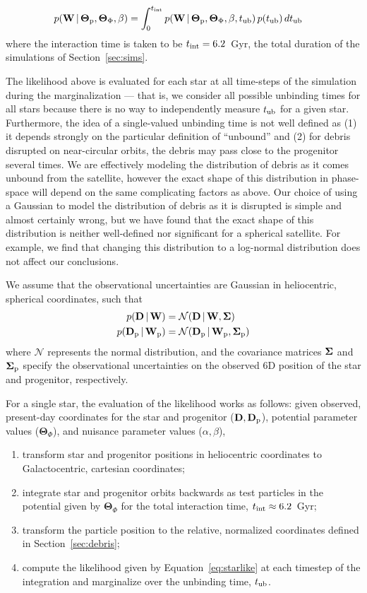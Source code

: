 \documentclass[letterpaper,12pt,preprint]{aastex}
\newcommand{\given}{\,|\,}
\newcommand{\D}{{\bf D}}
\newcommand{\W}{{\bf W}}
\newcommand{\bSigma}{{\bf \Sigma}}
\newcommand{\bs}{\boldsymbol}
\newcommand{\sat}{{\rm p}}
\newcommand{\tub}{t_{\rm ub}}
\newcommand{\tailbit}{\beta}
\newcommand{\Loffset}{\alpha}
\begin{document}
\begin{align}
	p(\W \given \bs{\Theta}_\sat, \bs{\Theta}_\Phi, \tailbit) &= \int^{t_{\rm int}}_0 p(\W \given \bs{\Theta}_\sat, \bs{\Theta}_\Phi, \tailbit, \tub)\,p(\tub)\,d\tub
\end{align}
where the interaction time is taken to be $t_{\rm int}=6.2$~Gyr, the total duration of the simulations of Section~\ref{sec:sims}.

The likelihood above is evaluated for each star at all time-steps of the simulation during the marginalization --- that is, we consider all possible unbinding times for all stars because there is no way to independently measure $\tub$ for a given star. Furthermore, the idea of a single-valued unbinding time is not well defined as (1) it depends strongly on the particular definition of ``unbound'' and (2) for debris disrupted on near-circular orbits, the debris may pass close to the progenitor several times. We are effectively modeling the distribution of debris as it comes unbound from the satellite, however the exact shape of this distribution in phase-space will depend on the same complicating factors as above. Our choice of using a Gaussian to model the distribution of debris as it is disrupted is simple and almost certainly wrong, but we have found that the exact shape of this distribution is neither well-defined nor significant for a spherical satellite. For example, we find that changing this distribution to a log-normal distribution does not affect our conclusions. 

We assume that the observational uncertainties are Gaussian in heliocentric, spherical coordinates, such that
\begin{align}
	p(\D \given \W) &= \mathcal{N}(\D \given \W, \bSigma)\label{eq:obsstar}\\
	p(\D_\sat \given \W_\sat) &= \mathcal{N}(\D_\sat \given \W_\sat, \bSigma_\sat)\label{eq:obsprog}
\end{align}
where $\mathcal{N}$ represents the normal distribution, and the covariance matrices $\bSigma$ and $\bSigma_\sat$ specify the observational uncertainties on the observed 6D position of the star and progenitor, respectively. 

For a single star, the evaluation of the likelihood works as follows: given observed, present-day coordinates for the star and progenitor ($\D,\D_\sat$), potential parameter values ($\bs{\Theta}_\Phi$), and nuisance parameter values ($\Loffset,\tailbit$),
\begin{enumerate}
	\item transform star and progenitor positions in heliocentric coordinates to Galactocentric, cartesian coordinates;
	\item integrate star and progenitor orbits backwards as test particles in the potential given by $\bs{\Theta}_\Phi$ for the total interaction time, $t_{\rm int}\approx6.2$~Gyr;
	\item transform the particle position to the relative, normalized coordinates defined in Section~\ref{sec:debris};
	\item compute the likelihood given by Equation~\ref{eq:starlike} at each timestep of the integration and marginalize over the unbinding time, $\tub$.
\end{enumerate}
\end{document}
